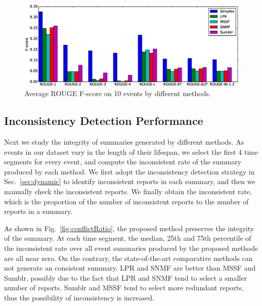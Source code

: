 \documentclass[envcountsame]{llncs}
\begin{document}
\vspace{-0.5cm}
\begin{figure}
    \centering
    \includegraphics[width=\textwidth]{rouge.eps}
\setlength{\abovecaptionskip}{-0.5cm}
\caption{Average ROUGE F-score on 10 events by different methods.}\label{fig:rouge}
\end{figure}
\vspace{-0.5cm}


\subsection{Inconsistency Detection Performance}
Next we study the integrity of summaries generated by different methods. As events in our dataset vary in the length of their lifespan, we select the first 4 time segments for every event, and compute the inconsistent rate of the summary produced by each method. We first adopt the inconsistency detection strategy in Sec.~\ref{sec:dynamic} to identify inconsistent reports in each summary, and then we manually check the inconsistent reports. We finally obtain the inconsistent rate, which is the proportion of the number of inconsistent reports to the number of reports in a summary.

As shown in Fig.~\ref{fig:conflictRatio}, the proposed method preserves the integrity of the summary. At each time segment, the median, 25th and 75th percentile of the inconsistent rate over all event summaries produced by the proposed methods are all near zero. On the contrary, the state-of-the-art comparative methods can not generate an consistent summary. LPR and SNMF are better than MSSF and Sumblr, possibly due to the fact that LPR and SNMF tend to select a smaller number of reports. Sumblr and MSSF tend to select more redundant reports, thus the possibility of inconsistency is increased.
\end{document}
